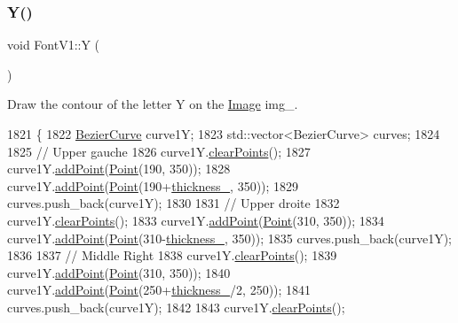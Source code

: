 \subsubsection{\texorpdfstring{Y()}{Y()}}
{\footnotesize\ttfamily void Font\+V1\+::Y (\begin{DoxyParamCaption}{ }\end{DoxyParamCaption})}



Draw the contour of the letter Y on the \mbox{\hyperlink{class_image}{Image}} img\+\_\+. 


\begin{DoxyCode}
1821               \{
1822     \mbox{\hyperlink{class_bezier_curve}{BezierCurve}} curve1Y;
1823     std::vector<BezierCurve> curves;
1824 
1825     \textcolor{comment}{// Upper gauche}
1826     curve1Y.\mbox{\hyperlink{class_bezier_curve_a0ba8ce66d5af5971ae6a1b506029728e}{clearPoints}}();
1827     curve1Y.\mbox{\hyperlink{class_bezier_curve_a38d16c18b36ae45619b05e26e226cf34}{addPoint}}(\mbox{\hyperlink{class_point}{Point}}(190, 350));
1828     curve1Y.\mbox{\hyperlink{class_bezier_curve_a38d16c18b36ae45619b05e26e226cf34}{addPoint}}(\mbox{\hyperlink{class_point}{Point}}(190+\mbox{\hyperlink{class_font_v1_aed8040e76be9a52833627b92f0fb4e5f}{thickness\_}}, 350));
1829     curves.push\_back(curve1Y);
1830 
1831     \textcolor{comment}{// Upper droite}
1832     curve1Y.\mbox{\hyperlink{class_bezier_curve_a0ba8ce66d5af5971ae6a1b506029728e}{clearPoints}}();
1833     curve1Y.\mbox{\hyperlink{class_bezier_curve_a38d16c18b36ae45619b05e26e226cf34}{addPoint}}(\mbox{\hyperlink{class_point}{Point}}(310, 350));
1834     curve1Y.\mbox{\hyperlink{class_bezier_curve_a38d16c18b36ae45619b05e26e226cf34}{addPoint}}(\mbox{\hyperlink{class_point}{Point}}(310-\mbox{\hyperlink{class_font_v1_aed8040e76be9a52833627b92f0fb4e5f}{thickness\_}}, 350));
1835     curves.push\_back(curve1Y);
1836 
1837     \textcolor{comment}{// Middle Right}
1838     curve1Y.\mbox{\hyperlink{class_bezier_curve_a0ba8ce66d5af5971ae6a1b506029728e}{clearPoints}}();
1839     curve1Y.\mbox{\hyperlink{class_bezier_curve_a38d16c18b36ae45619b05e26e226cf34}{addPoint}}(\mbox{\hyperlink{class_point}{Point}}(310, 350));
1840     curve1Y.\mbox{\hyperlink{class_bezier_curve_a38d16c18b36ae45619b05e26e226cf34}{addPoint}}(\mbox{\hyperlink{class_point}{Point}}(250+\mbox{\hyperlink{class_font_v1_aed8040e76be9a52833627b92f0fb4e5f}{thickness\_}}/2, 250));
1841     curves.push\_back(curve1Y);
1842 
1843     curve1Y.\mbox{\hyperlink{class_bezier_curve_a0ba8ce66d5af5971ae6a1b506029728e}{clearPoints}}();

\end{DoxyCode}
